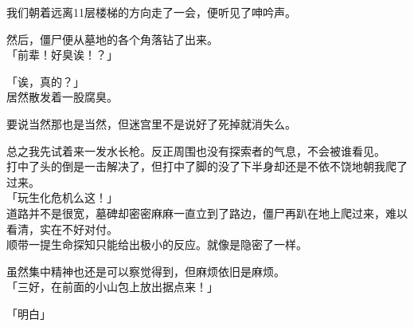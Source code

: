 我们朝着远离11层楼梯的方向走了一会，便听见了呻吟声。

然后，僵尸便从墓地的各个角落钻了出来。\\

「前辈！好臭诶！？」

「诶，真的？」\\

居然散发着一股腐臭。

要说当然那也是当然，但迷宫里不是说好了死掉就消失么。

总之我先试着来一发水长枪。反正周围也没有探索者的气息，不会被谁看见。\\

打中了头的倒是一击解决了，但打中了脚的没了下半身却还是不依不饶地朝我爬了过来。\\

「玩生化危机么这！」\\

道路并不是很宽，墓碑却密密麻麻一直立到了路边，僵尸再趴在地上爬过来，难以看清，实在不好对付。\\

顺带一提生命探知只能给出极小的反应。就像是隐密了一样。

虽然集中精神也还是可以察觉得到，但麻烦依旧是麻烦。\\

「三好，在前面的小山包上放出据点来！」

「明白」\\

